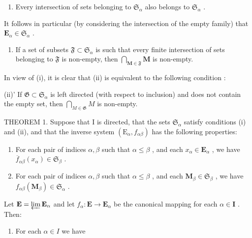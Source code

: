 \begin{enumerate}
\def\labelenumi{(\roman{enumi})}
\tightlist
\item
  Every intersection of sets belonging to \(\mathfrak{S}_{\alpha}\) also belongs to \(\mathfrak{S}_{\alpha}\) .
\end{enumerate}

It follows in particular (by considering the intersection of the empty family) that \(\mathbf{E}_{\alpha} \in \mathfrak{S}_{\alpha}\) .

\begin{enumerate}
\def\labelenumi{(\roman{enumi})}
\setcounter{enumi}{1}
\tightlist
\item
  If a set of subsets \(\mathfrak{F} \subset \mathfrak{S}_{\alpha}\) is such that every finite intersection of sets belonging to \(\mathfrak{F}\) is non-empty, then \(\bigcap_{\mathbf{M} \in \mathfrak{F}} \mathbf{M}\) is non-empty.
\end{enumerate}

In view of (i), it is clear that (ii) is equivalent to the following condition :

(ii)' If \(\mathfrak{G} \subset \mathfrak{S}_{\alpha}\) is left directed (with respect to inclusion) and does not contain the empty set, then \(\bigcap_{M \in \mathfrak{G}} M\) is non-empty.

THEOREM 1. Suppose that I is directed, that the sets \(\mathfrak{S}_{\alpha}\) satisfy conditions (i) and (ii), and that the inverse system \((\mathrm{E}_{\alpha}, f_{\alpha\beta})\) has the following properties:

\begin{enumerate}
\def\labelenumi{(\roman{enumi})}
\setcounter{enumi}{2}
\item
  For each pair of indices \(\alpha, \beta\) such that \(\alpha \leqslant \beta\) , and each \(x_{\alpha} \in \mathbf{E}_{\alpha}\) , we have \(\overline{f}_{\alpha\beta}(x_{\alpha}) \in \mathfrak{S}_{\beta}\) .
\item
  For each pair of indices \(\alpha, \beta\) such that \(\alpha \leqslant \beta\) , and each \(\mathbf{M}_{\beta} \in \mathfrak{S}_{\beta}\) , we have \(f_{\alpha \beta}(\mathbf{M}_{\beta}) \in \mathfrak{S}_{\alpha}\) .
\end{enumerate}

Let \(\mathbf{E} = \varprojlim \mathbf{E}_{\alpha}\) and let \(f_{\alpha}: \mathbf{E} \to \mathbf{E}_{\alpha}\) be the canonical mapping for each \(\alpha \in \mathbf{I}\) . Then:

\begin{enumerate}
\def\labelenumi{(\alph{enumi})}
\tightlist
\item
  For each \(\alpha \in I\) we have
\end{enumerate}

